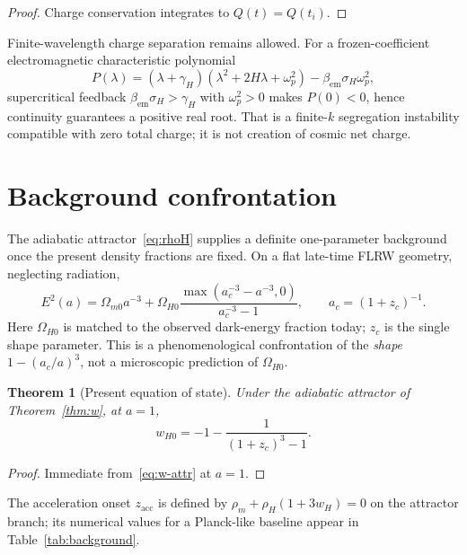 \documentclass[11pt]{article}
\newtheorem{theorem}{Theorem}[section]
\theoremstyle{definition}
\theoremstyle{remark}
\begin{document}
\begin{proof}
Charge conservation integrates to $Q(t)=Q(t_i)$.
\end{proof}

Finite-wavelength charge separation remains allowed.
For a frozen-coefficient electromagnetic characteristic polynomial
\begin{equation}
P(\lambda)=(\lambda+\gamma_H)(\lambda^2+2H\lambda+\omega_p^2)-\beta_{\mathrm{em}}\sigma_H\omega_p^2,
\end{equation}
supercritical feedback $\beta_{\mathrm{em}}\sigma_H>\gamma_H$ with $\omega_p^2>0$ makes $P(0)<0$, hence continuity guarantees a positive real root.
That is a finite-$k$ segregation instability compatible with zero total charge; it is not creation of cosmic net charge.

\section{Background confrontation}
\label{sec:background}
The adiabatic attractor~\eqref{eq:rhoH} supplies a definite one-parameter background once the present density fractions are fixed.
On a flat late-time FLRW geometry, neglecting radiation,
\begin{equation}
\label{eq:E}
\boxed{
E^2(a)=\Omega_{m0}a^{-3}
+\Omega_{H0}\frac{\max(a_c^{-3}-a^{-3},0)}{a_c^{-3}-1},
\qquad a_c=(1+z_c)^{-1}.
}
\end{equation}
Here $\Omega_{H0}$ is matched to the observed dark-energy fraction today; $z_c$ is the single shape parameter.
This is a phenomenological confrontation of the \emph{shape} $1-(a_c/a)^3$, not a microscopic prediction of $\Omega_{H0}$.

\begin{theorem}[Present equation of state]
\label{thm:background-diagnostics}
Under the adiabatic attractor of Theorem~\ref{thm:w}, at $a=1$,
\begin{equation}
\boxed{w_{H0}=-1-\frac{1}{(1+z_c)^3-1}.}
\end{equation}
\end{theorem}

\begin{proof}
Immediate from~\eqref{eq:w-attr} at $a=1$.
\end{proof}

The acceleration onset $z_{\mathrm{acc}}$ is defined by $\rho_m+\rho_H(1+3w_H)=0$ on the attractor branch; its numerical values for a Planck-like baseline appear in Table~\ref{tab:background}.
\end{document}
